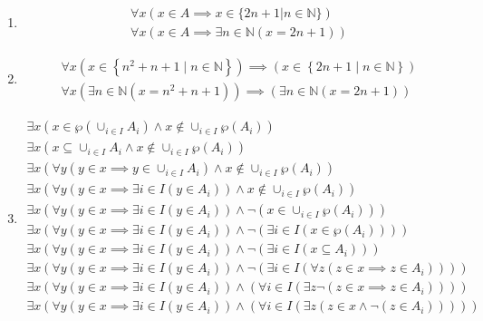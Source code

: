 \begin{questions}
\begin{solution}
\begin{enumerate}[label=(\alph*)]
    \item {
        \begin{align*}
        \forall x (x \in A \implies x \in \{2n + 1 | n \in \mathbb{N}\}) \\
        \forall x (x \in A \implies \exists n \in \mathbb{N} (x=2n+1))
        \end{align*}
    }
    \item {
        \begin{align*}
        \forall x (x \in \left\{n^2 + n + 1 \mid n \in \mathbb{N} \right\}) \implies (x \in \left\{2n + 1 \mid n \in \mathbb{N} \right\}) \\
        \forall x (\exists n \in \mathbb{N} (x = n^2 + n + 1)) \implies (\exists n \in \mathbb{N} (x=2n+1))
        \end{align*}
    }
    \item {
        \begin{align*}
        \exists x(x \in \wp(\cup_{i \in I} A_i) \land x \notin \cup_{i \in I} \wp(A_i)) \\
        \exists x(x \subseteq \cup_{i \in I} A_i \land x \notin \cup_{i \in I} \wp(A_i)) \\
        \exists x( \forall y (y \in x \implies y \in \cup_{i \in I} A_i) \land
        x \notin \cup_{i \in I} \wp(A_i)) \\
        \exists x( \forall y (y \in x \implies \exists i \in I(y \in A_i))
        \land x \notin \cup_{i \in I} \wp(A_i)) \\
        \exists x( \forall y (y \in x \implies \exists i \in I(y \in A_i))
        \land \neg (x \in \cup_{i \in I} \wp(A_i))) \\
        \exists x( \forall y (y \in x \implies \exists i \in I(y \in A_i))
        \land \neg (\exists i \in I(x \in \wp(A_i)))) \\
        \exists x( \forall y (y \in x \implies \exists i \in I(y \in A_i))
        \land \neg (\exists i \in I(x \subseteq A_i))) \\
        \exists x( \forall y (y \in x \implies \exists i \in I(y \in A_i))
        \land \neg (\exists i \in I(\forall z (z \in x \implies z \in A_i)))) \\
        \exists x( \forall y (y \in x \implies \exists i \in I(y \in A_i))
        \land (\forall i \in I(\exists z \neg(z \in x \implies z \in A_i)))) \\
        \exists x( \forall y (y \in x \implies \exists i \in I(y \in A_i))
        \land (\forall i \in I(\exists z (z \in x \land \neg(z \in A_i))))) \\
        \end{align*}
    }
    \end{enumerate}
\end{solution}


\end{questions}
